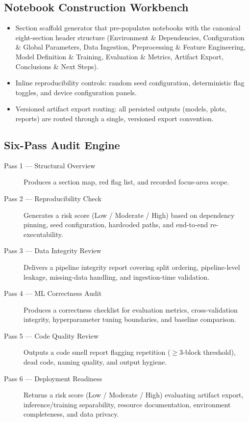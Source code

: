 \documentclass[11pt, a4paper]{article}
\begin{document}
\subsection*{Notebook Construction Workbench}

\begin{itemize}
  \item Section scaffold generator that pre-populates notebooks with the canonical
    eight-section header structure (Environment \& Dependencies, Configuration \&
    Global Parameters, Data Ingestion, Preprocessing \& Feature Engineering, Model
    Definition \& Training, Evaluation \& Metrics, Artifact Export, Conclusions \&
    Next Steps).

  \item Inline reproducibility controls: random seed configuration, deterministic
    flag toggles, and device configuration panels.

  \item Versioned artifact export routing: all persisted outputs (models, plots,
    reports) are routed through a single, versioned export convention.
\end{itemize}

\subsection*{Six-Pass Audit Engine}

\begin{description}
  \item[Pass 1 — Structural Overview] Produces a section map, red flag list, and
    recorded focus-area scope.

  \item[Pass 2 — Reproducibility Check] Generates a risk score (Low / Moderate /
    High) based on dependency pinning, seed configuration, hardcoded paths, and
    end-to-end re-executability.

  \item[Pass 3 — Data Integrity Review] Delivers a pipeline integrity report covering
    split ordering, pipeline-level leakage, missing-data handling, and
    ingestion-time validation.

  \item[Pass 4 — ML Correctness Audit] Produces a correctness checklist for
    evaluation metrics, cross-validation integrity, hyperparameter tuning boundaries,
    and baseline comparison.

  \item[Pass 5 — Code Quality Review] Outputs a code smell report flagging
    repetition ($\ge 3$-block threshold), dead code, naming quality, and output
    hygiene.

  \item[Pass 6 — Deployment Readiness] Returns a risk score (Low / Moderate / High)
    evaluating artifact export, inference/training separability, resource
    documentation, environment completeness, and data privacy.
\end{description}
\end{document}
